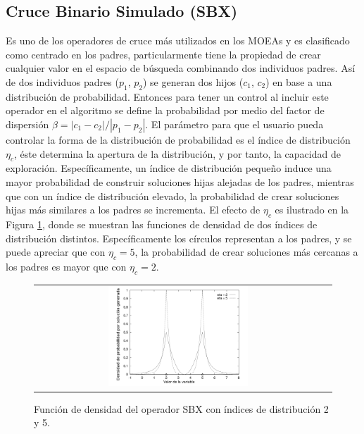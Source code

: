 \subsection{Cruce Binario Simulado (SBX)}

Es uno de los operadores de cruce más utilizados en los MOEAs y es clasificado como centrado en los padres, particularmente tiene la propiedad de crear cualquier valor en el espacio de búsqueda combinando dos individuos padres.
%
Así de dos individuos padres ($p_1$, $p_2$) se generan dos hijos ($c_1$, $c_2$) en base a una distribución de probabilidad.
%
Entonces para tener un control al incluir este operador en el algoritmo se define la probabilidad por medio del factor de dispersión $\beta = | c_1 - c_2| / |p_1 - p_2|$.
%
El parámetro para que el usuario pueda controlar la forma de la distribución de probabilidad es el índice de distribución $\eta_c$, éste determina la apertura de la distribución, y por tanto, la capacidad de exploración.
%
Específicamente, un índice de distribución pequeño induce una mayor probabilidad de construir soluciones hijas alejadas de los padres, mientras que con un índice de distribución elevado, la probabilidad de crear soluciones hijas más similares a los padres se incrementa. 
%
%
El efecto de $\eta_c$ es ilustrado en la Figura \ref{fig:Density_SBX}, donde se muestran las funciones de densidad de dos índices de distribución distintos.
%
Específicamente los círculos representan a los padres, y se puede apreciar que con $\eta_c=5$, la probabilidad de crear soluciones más cercanas a los padres es mayor que con $\eta_c=2$.
\begin{figure}[!t]%
\centering
\begin{tabular}{cc}
   \includegraphics[width=0.5\textwidth]{Figures_Chapter6/DensitySBX.png} &
\end{tabular}
\caption{Función de densidad del operador SBX con índices de distribución 2 y 5.}
\label{fig:Density_SBX}
\end{figure}


